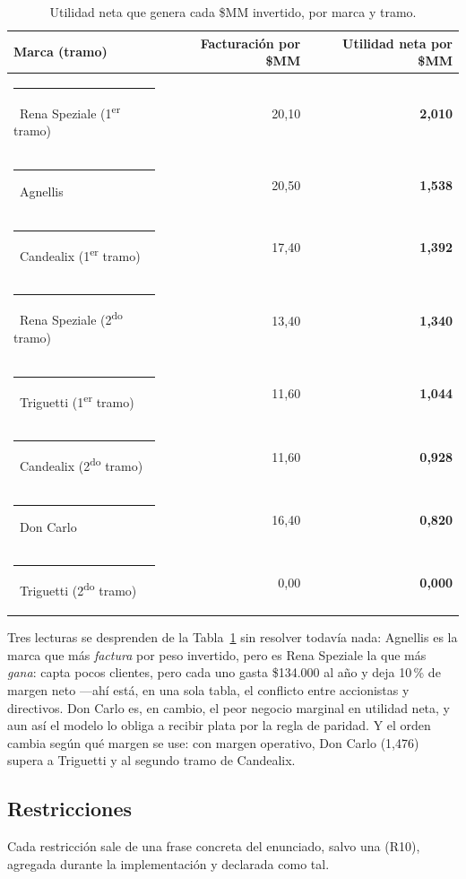 \documentclass[10pt,a4paper]{article}
\newcommand{\marca}[2]{\textcolor{#1}{\rule{0.28cm}{0.28cm}}~#2}
\begin{document}
\begin{table}[htbp]
\centering\small
\caption{Utilidad neta que genera cada \$MM invertido, por marca y tramo.}
\label{tab:utilidad_millon}
\begin{tabular}{lrr}
\toprule
Marca (tramo) & Facturación por \$MM & Utilidad neta por \$MM \\
\midrule
\marca{rena}{Rena Speziale} (1\textsuperscript{er} tramo)  & 20{,}10 & \textbf{2{,}010} \\
\marca{agnellis}{Agnellis}                                  & 20{,}50 & \textbf{1{,}538} \\
\marca{candealix}{Candealix} (1\textsuperscript{er} tramo)  & 17{,}40 & \textbf{1{,}392} \\
\marca{rena}{Rena Speziale} (2\textsuperscript{do} tramo)   & 13{,}40 & \textbf{1{,}340} \\
\marca{triguetti}{Triguetti} (1\textsuperscript{er} tramo)  & 11{,}60 & \textbf{1{,}044} \\
\marca{candealix}{Candealix} (2\textsuperscript{do} tramo)  & 11{,}60 & \textbf{0{,}928} \\
\marca{doncarlo}{Don Carlo}                                 & 16{,}40 & \textbf{0{,}820} \\
\marca{triguetti}{Triguetti} (2\textsuperscript{do} tramo)  & 0{,}00  & \textbf{0{,}000} \\
\bottomrule
\end{tabular}
\end{table}

Tres lecturas se desprenden de la Tabla~\ref{tab:utilidad_millon} sin resolver todavía nada:
Agnellis es la marca que más \emph{factura} por peso invertido, pero es Rena
Speziale la que más \emph{gana}: capta pocos clientes, pero cada uno gasta
\$134.000 al año y deja 10\,\% de margen neto —ahí está, en una sola tabla, el
conflicto entre accionistas y directivos. Don Carlo es, en cambio, el peor
negocio marginal en utilidad neta, y aun así el modelo lo obliga a recibir
plata por la regla de paridad. Y el orden cambia según qué margen se use: con
margen operativo, Don Carlo (1,476) supera a Triguetti y al segundo tramo de
Candealix.

\subsection{Restricciones}
\label{sec:restricciones}

Cada restricción sale de una frase concreta del enunciado, salvo una (R10),
agregada durante la implementación y declarada como tal.
\end{document}
